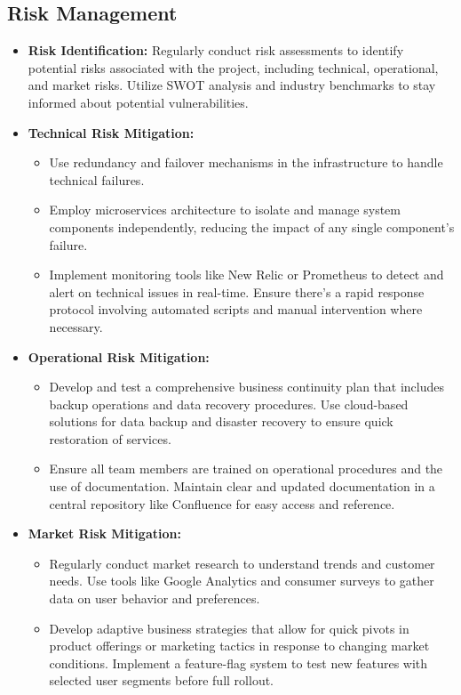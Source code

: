 \documentclass[11pt]{article}
\begin{document}
	\subsection*{Risk Management}
	\begin{itemize}
		\item \textbf{Risk Identification:} Regularly conduct risk assessments to identify potential risks associated with the project, including technical, operational, and market risks. Utilize SWOT analysis and industry benchmarks to stay informed about potential vulnerabilities.
		\item \textbf{Technical Risk Mitigation:} 
		\begin{itemize}
			\item Use redundancy and failover mechanisms in the infrastructure to handle technical failures.
			\item Employ microservices architecture to isolate and manage system components independently, reducing the impact of any single component's failure.
			\item Implement monitoring tools like New Relic or Prometheus to detect and alert on technical issues in real-time. Ensure there's a rapid response protocol involving automated scripts and manual intervention where necessary.
		\end{itemize}
		\item \textbf{Operational Risk Mitigation:}
		\begin{itemize}
			\item Develop and test a comprehensive business continuity plan that includes backup operations and data recovery procedures. Use cloud-based solutions for data backup and disaster recovery to ensure quick restoration of services.
			\item Ensure all team members are trained on operational procedures and the use of documentation. Maintain clear and updated documentation in a central repository like Confluence for easy access and reference.
		\end{itemize}
		\item \textbf{Market Risk Mitigation:}
		\begin{itemize}
			\item Regularly conduct market research to understand trends and customer needs. Use tools like Google Analytics and consumer surveys to gather data on user behavior and preferences.
			\item Develop adaptive business strategies that allow for quick pivots in product offerings or marketing tactics in response to changing market conditions. Implement a feature-flag system to test new features with selected user segments before full rollout.

\end{itemize}
\end{itemize}
\end{document}
